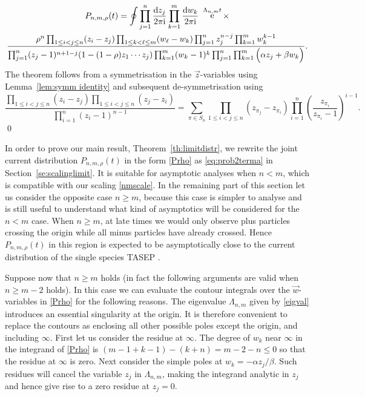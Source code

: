\documentclass[cmp]{svjour}
\numberwithin{theorem}{section}
\numberwithin{equation}{section}
\DeclareMathOperator{\e}{e}
\def\dd{{\rm d}}
\def\ii{{\rm i}}
\begin{document}
\begin{multline*}
P_{n,m,\rho}(t)
=
\oint \prod_{j=1}^n \frac{\dd z_j }{2\pi \ii} \prod_{k=1}^m
\frac{\dd w_k }{2\pi \ii}\ \e^{\Lambda_{n,m} t} \times \\ \frac{\rho^n \prod_{1\le i<j\le n} (z_i-z_j) \prod_{1\le k< \ell \le m} (w_\ell -w_k) \prod_{j=1}^n z_j^{n-j} \prod_{k=1}^m w_k^{k-1}}
{\prod_{j=1}^n (z_j-1)^{n+1-j} (1-(1-\rho) z_1 \cdots z_j)
\prod_{k=1}^m (w_k-1)^{k} \prod_{j=1}^n \prod_{k=1}^m \Big(\alpha z_j + \beta w_k\Big)}.
\end{multline*}
The theorem follows from a symmetrisation in the $\vec{z}$-variables using Lemma~\ref{lem:symm identity} and subsequent de-symmetrisation using 
\[
\frac{\prod_{1\leq i<j\leq n}(z_i-z_j) \prod_{1\leq i<j\leq n}(z_j-z_i) }{\prod_{i=1}^n(z_i-1)^{n-1}} = \sum_{\pi\in S_n} \prod_{1\leq i<j\leq n}(z_{\pi_j}-z_{\pi_i}) \prod_{i=1}^n \left(\frac{z_{\pi_i}}{z_{\pi_i}-1}\right)^{i-1}.
\]
\qed


In order to prove our main result,  Theorem~\ref{th:limitdistr}, we rewrite the joint current distribution $P_{n,m,\rho}(t)$ in the form \eqref{Prho} as \eqref{eq:prob2terma} in Section~\ref{se:scalinglimit}. It is suitable for asymptotic analyses when $n<m$, which is compatible with our scaling \eqref{nmscale}. 
In the remaining part of this section let us consider the opposite case $n\geq m$, 
because this case is simpler to analyse and is still useful to 
understand what kind of asymptotics will be considered for the $n<m$ case.
When $n\geq m$, at late times we would only observe plus particles crossing the origin while all minus particles have already crossed. Hence
$P_{n,m,\rho}(t)$ in this region is expected to be  asymptotically close to the current distribution of the single species TASEP \cite{J2000,PS2002,BFPS2007}.  



Suppose now that $n\geq m$ holds (in fact the following arguments are valid when $n \geq m-2$ holds). In this case we can evaluate the contour integrals over the $\vec{w}$-variables in \eqref{Prho} for the following reasons. The eigenvalue $\Lambda_{n,m}$ given by \eqref{eigval} introduces an essential singularity at the origin. It is therefore convenient to replace the contours as enclosing all other possible poles except the origin, and including $\infty$. First let us consider the residue at $\infty$. The degree of $w_k$ near $\infty$ in the integrand of \eqref{Prho} is $(m-1+k-1)-(k+n)=m-2-n \leq 0$ so that the residue at $\infty$ is zero. Next consider the simple poles at $w_k=-\alpha z_j/\beta$. Such residues will cancel the variable $z_j$ in $\Lambda_{n,m}$, making the integrand analytic in $z_j$ and hence give rise to a zero residue at $z_j=0$.
\end{document}
